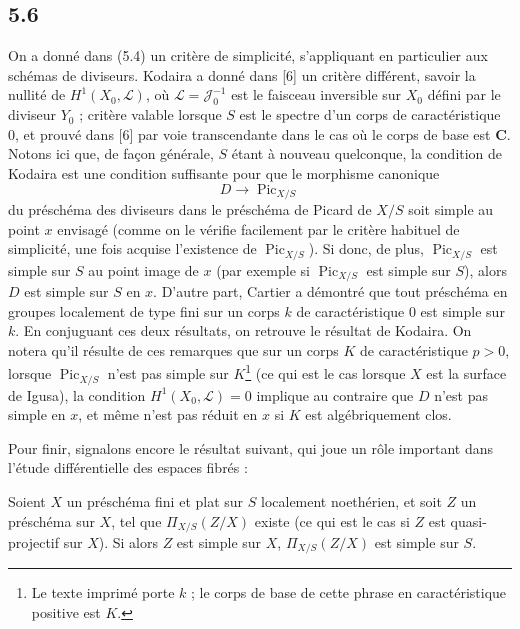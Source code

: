 \subsection*{5.6}

On a donné dans (5.4) un critère de simplicité, s'appliquant en particulier aux
schémas de diviseurs. Kodaira a donné dans [6] un critère différent, savoir la
nullité de $H^1(X_0,\mathcal L)$, où $\mathcal L=\mathcal J_0^{-1}$ est le
faisceau inversible sur $X_0$ défini par le diviseur $Y_0$ ; critère valable
lorsque $S$ est le spectre d'un corps de caractéristique 0, et prouvé dans [6]
par voie transcendante dans le cas où le corps de base est $\mathbf C$. Notons
ici que, de façon générale, $S$ étant à nouveau quelconque, la condition de
Kodaira est une condition suffisante pour que le morphisme canonique
\[
D\longrightarrow\operatorname{Pic}_{X/S}
\]
du préschéma des diviseurs dans le préschéma de Picard de $X/S$ soit simple au
point $x$ envisagé (comme on le vérifie facilement par le critère habituel de
simplicité, une fois acquise l'existence de $\operatorname{Pic}_{X/S}$). Si
donc, de plus, $\operatorname{Pic}_{X/S}$ est simple sur $S$ au point image de
$x$ (par exemple si $\operatorname{Pic}_{X/S}$ est simple sur $S$), alors $D$
est simple sur $S$ en $x$. D'autre part, Cartier a démontré que tout préschéma
en groupes localement de type fini sur un corps $k$ de caractéristique 0 est
simple sur $k$. En conjuguant ces deux résultats, on retrouve le résultat de
Kodaira. On notera qu'il résulte de ces remarques que sur un corps $K$ de
caractéristique $p>0$, lorsque $\operatorname{Pic}_{X/S}$ n'est pas simple sur
$K$\footnote{Le texte imprimé porte $k$ ; le corps de base de cette phrase en caractéristique positive est $K$.} (ce qui est le cas lorsque $X$ est la surface de Igusa), la condition
$H^1(X_0,\mathcal L)=0$ implique au contraire que $D$ n'est pas simple en $x$,
et même n'est pas réduit en $x$ si $K$ est algébriquement clos.

Pour finir, signalons encore le résultat suivant, qui joue un rôle important
dans l'étude différentielle des espaces fibrés :

 Soient $X$ un préschéma fini et plat sur $S$
localement noethérien, et soit $Z$ un préschéma sur $X$, tel que
$\Pi_{X/S}(Z/X)$ existe (ce qui est le cas si $Z$ est quasi-projectif sur $X$).
Si alors $Z$ est simple sur $X$, $\Pi_{X/S}(Z/X)$ est simple sur $S$.

